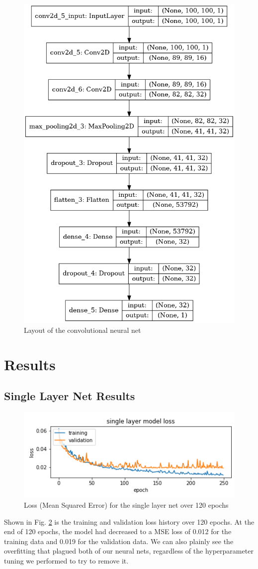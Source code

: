 \documentclass[conference]{IEEEtran}
\begin{document}
\begin{figure}[htbp]
\centerline{\includegraphics[width=0.5\linewidth]{./Images/convNet.png}}
\caption{Layout of the convolutional neural net}
\label{fig:ConvNetArchitecture}
\end{figure}


\section{Results}

\subsection{Single Layer Net Results}

\begin{figure}[htbp]
\centerline{\includegraphics[width=0.75\linewidth]{./Images/SingleModelLoss.png}}
\caption{Loss (Mean Squared Error) for the single layer net over 120 epochs}
\label{fig:SingleModelLoss}
\end{figure}

Shown in Fig. \ref{fig:SingleModelLoss} is the training and validation loss history over 120 epochs. At the end of 120 epochs, the model had decreased to a MSE loss of 0.012 for the training data and 0.019 for the validation data. We can also plainly see the overfitting that plagued both of our neural nets, regardless of the hyperparameter tuning we performed to try to remove it.
\end{document}
